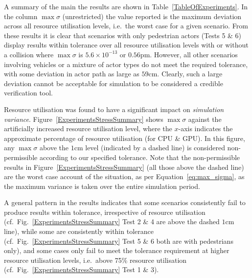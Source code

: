 \documentclass[letterpaper, 10 pt, journal, twoside]{IEEEtran}
\begin{document}

A summary of the main the results are shown in Table~\ref{TableOfExperiments}.  In the column $\max\sigma$ (unrestricted) the value reported is the maximum deviation across all resource utilisation levels, i.e.\ the worst case for a given scenario.  
%
From these results it is clear that scenarios with only pedestrian actors (Tests 5 \& 6) display results within tolerance over all resource utilisation levels with or without a collision where $\max\sigma$ is $5.6\times10^{-13}$ or $0.56\si{\pico\metre}$. 
%
However, all other scenarios involving vehicles or a mixture of actor types do not meet the required tolerance, with some deviation in actor path as large as $59$cm.
%
%
Clearly, such a large deviation cannot be acceptable for simulation to be considered a credible verification tool.

Resource utilisation was found to have a significant impact on \textit{simulation variance}.
%
Figure~\ref{ExperimentsStressSummary} shows $\max\sigma$ against the artificially increased resource utilisation level, where the $x$-axis indicates the approximate percentage of resource utilisation (for CPU \& GPU). In this figure, any $\max\sigma$ above the $1$cm level (indicated by a dashed line) is considered non-permissible according to our specified tolerance. 
%
Note that the non-permissible results in Figure~\ref{ExperimentsStressSummary} (all those above the dashed line) are the worst case account of the situation, as per Equation~\ref{eq:max_sigma}, as the maximum variance is taken over the entire simulation period.
%
%

A general pattern in the results indicates that some scenarios consistently fail to produce results within tolerance, irrespective of resource utilisation (cf.\ Fig.~\ref{ExperimentsStressSummary} Test 2 \& 4 are above the dashed $1$cm line), while some are consistently within tolerance (cf.\ Fig.~\ref{ExperimentsStressSummary} Test 5 \& 6 both are with pedestrians only), and some cases only fail to meet the tolerance requirement at higher resource utilisation levels, i.e.\ above 75\% resource utilisation (cf.\ Fig.~\ref{ExperimentsStressSummary} Test 1 \& 3). 
\end{document}
